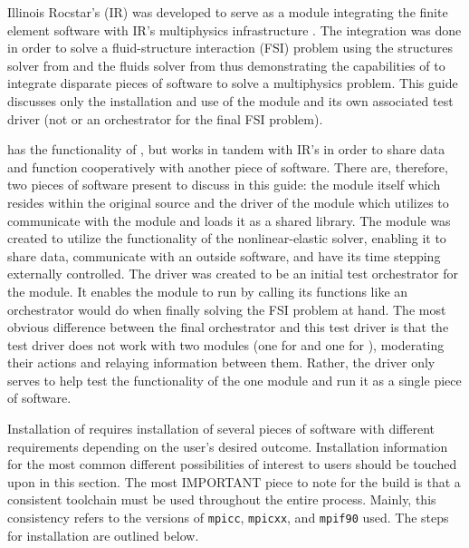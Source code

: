  
Illinois Rocstar's (IR) \irprogram was developed to serve as a module integrating the  finite element software with IR's multiphysics infrastructure .  The integration was done in order to solve a fluid-structure interaction (FSI) problem using the structures solver from \elmer and the fluids solver from \foam thus demonstrating the capabilities of \impact to integrate disparate pieces of software to solve a multiphysics problem. This guide discusses only the installation and use of the \elmer module and its own associated test driver (not \foam or an orchestrator for the final FSI problem).


\irprogram has the functionality of \elmer\!\!, but works in tandem with IR's \impact in order to share data and function cooperatively with another piece of software. There are, therefore, two pieces of software present to discuss in this guide: the \elmer module itself which resides within the original \elmer source and the driver of the \elmer module which utilizes \impact to communicate with the module and loads it as a shared library. The module was created to utilize the functionality of the \elmer nonlinear-elastic solver, enabling it to share data, communicate with an outside software, and have its time stepping externally controlled. The driver was created to be an initial test orchestrator for the module. It enables the module to run by calling its functions like an orchestrator would do when finally solving the FSI problem at hand. The most obvious difference between the final orchestrator and this test driver is that the test driver does not work with two modules (one for \elmer and one for \foam), moderating their actions and relaying information between them. Rather, the driver only serves to help test the functionality of the one \elmer module and run it as a single piece of software.

Installation of \irprogram requires installation of several pieces of software with different requirements depending on the user's desired outcome. Installation information for the most common different possibilities of interest to users should be touched upon in this section. The most IMPORTANT piece to note for the build is that a consistent toolchain must be used throughout the entire process. Mainly, this consistency refers to the versions of \texttt{mpicc}, \texttt{mpicxx}, and \texttt{mpif90} used. The steps for installation are outlined below.

